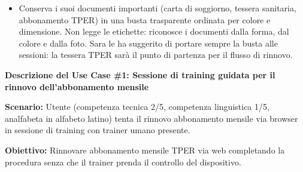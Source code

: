 ﻿\documentclass[11pt,a4paper]{article}
\begin{document}
\begin{center}
\begin{tcolorbox}[base,colback=backgroundColor!50]
{\begin{itemize}[leftmargin=*]
        \item Conserva i suoi documenti importanti
        (carta di soggiorno, tessera sanitaria,
        abbonamento TPER) in una busta trasparente
        ordinata per colore e dimensione. Non legge
        le etichette: riconosce i documenti dalla
        forma, dal colore e dalla foto.
        Sara le ha suggerito di portare sempre
        la busta alle sessioni: la tessera TPER
        sarà il punto di partenza per il flusso
        di rinnovo.
    \end{itemize}
    }
\end{tcolorbox}

\begin{tcolorbox}[sectionbox,colback=primaryColor!10]
    \textbf{Descrizione del Use Case \#1: Sessione di training guidata per il rinnovo dell'abbonamento mensile}
\end{tcolorbox}

\vspace{0.3cm}

\begin{tcolorbox}[base]
    {\small
    \textbf{Scenario:} Utente (competenza tecnica 2/5, competenza linguistica 1/5, analfabeta in alfabeto latino) tenta il rinnovo abbonamento mensile via browser in sessione di training con trainer umano presente.

    \textbf{Obiettivo:} Rinnovare abbonamento mensile TPER via web completando la procedura senza che il trainer prenda il controllo del dispositivo.

}
\end{tcolorbox}
\end{center}
\end{document}

